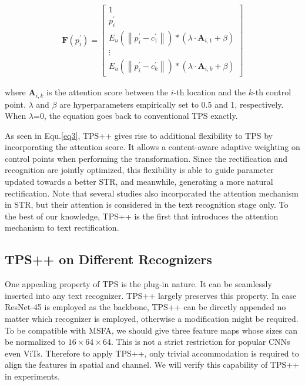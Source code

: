 \documentclass{article}
\begin{document}
\begin{gather}
\boldsymbol{F}\left(p^{\prime}_{i}\right)=\left[\begin{array}{c}
1 \\
p^{\prime}_{i} \\
E_{u}\left(\left\|p^{\prime}_{i}-c^{\prime}_{1}\right\|\right) *\left(\lambda \cdot \boldsymbol{A}_{i,1}+\beta\right) \\
\vdots \\
E_{u}\left(\left\|p^{\prime}_{i}-c^{\prime}_{k}\right\|\right) *\left(\lambda \cdot \boldsymbol{A}_{i,k}+\beta\right)
\end{array}\right]
\label{eq3}
\end{gather}


\noindent where $\boldsymbol{A}_{i,k}$ is the attention score between the $i$-th location and the $k$-th control point. $\lambda$ and $\beta$ are hyperparameters empirically set to 0.5 and 1, respectively. When $\lambda$=0, the equation goes back to conventional TPS exactly.

As seen in Equ.\ref{eq3}, TPS++ gives rise to additional flexibility to TPS by incorporating the attention score. It allows a content-aware adaptive weighting on control points when performing the transformation. Since the rectification and recognition are jointly optimized, this flexibility is able to guide parameter updated towards a better STR, and meanwhile, generating a more natural rectification. Note that several studies \cite{lee2016attention_origin,cheng2017focusing_attention,shi2018aster,sheng2019nrtr,lin2021stan} also incorporated the attention mechanism in STR, but their attention is considered in the text recognition stage only. To the best of our knowledge, TPS++ is the first that introduces the attention mechanism to text rectification.


\subsection{TPS++ on Different Recognizers}
One appealing property of TPS is the plug-in nature. It can be seamlessly inserted into any text recognizer. TPS++ largely preserves this property. In case ResNet-45 is employed as the backbone, TPS++ can be directly appended no matter which recognizer is employed, otherwise a modification might be required. To be compatible with MSFA, we should give three feature maps whose sizes can be normalized to $16\times64\times64$. This is not a strict restriction for popular CNNs even ViTs. Therefore to apply TPS++, only trivial accommodation is required to align the features in spatial and channel. We will verify this capability of TPS++ in experiments.
\end{document}

